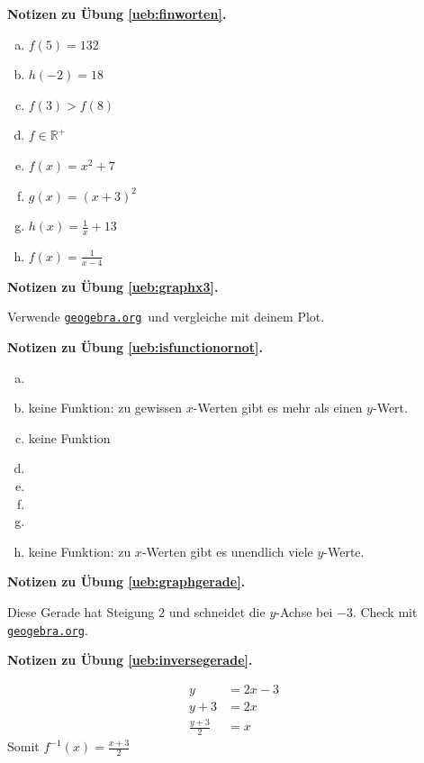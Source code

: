 \documentclass[%
11pt,%
twoside,%
titlepage,%
swissgerman,%
headsepline%
]{scrartcl}
\newcommand{\faReturnGray}{\textcolor{gray}{\faMailReply}} %
\newcommand{\geogebralink}{\href{https://www.geogebra.org/calculator}{\texttt{geogebra.org}}}
\theoremstyle{definition}
\theoremstyle{plain}
\newcommand{\concatueb}[1]{ueb:#1}%
\newcommand{\concatlsg}[1]{lsg:#1}%
\newenvironment{lsg}[1]{%
    \par\noindent\textbf{Notizen zu Übung \ref{\concatueb{#1}}.}%
    \label{\concatlsg{#1}} %
    \hfill\hyperref[\concatueb{#1}]{\faReturnGray}\par %
}{%
    \par%
}
\begin{document}
\begin{lsg}{finworten}
	\begin{enumerate}[a)]
		\item $f(5)=132$
		\item $h(-2)=18$
		\item $f(3)>f(8)$
		\item $f\in\mathbb{R}^{+}$
		\item $f(x)=x^{2}+7$
		\item $g(x)=(x+3)^{2}$
		\item $h(x)=\frac{1}{x}+13$
		\item $f(x)=\frac{1}{x-4}$
	\end{enumerate}
\end{lsg}
\begin{lsg}{graphx3}
	Verwende \geogebralink\   und vergleiche mit deinem Plot.
\end{lsg}
\begin{lsg}{isfunctionornot}
  \begin{enumerate}[a)]
    \item \checkmark
    \item keine Funktion: zu gewissen $x$-Werten gibt es mehr als einen $y$-Wert.
    \item keine Funktion
    \item \checkmark
    \item \checkmark
    \item \checkmark
    \item \checkmark
    \item keine Funktion: zu $x$-Werten gibt es unendlich viele $y$-Werte.
  \end{enumerate}
\end{lsg}

\begin{lsg}{graphgerade}
	Diese Gerade hat Steigung $2$ und schneidet die $y$-Achse bei $-3$. Check mit \geogebralink.
\end{lsg}

\begin{lsg}{inversegerade}
	\begin{align*}
	y &= 2x-3\tag{$+3$}\\
	y+3 &= 2x\tag{$\div2$}\\
	\frac{y+3}{2} &= x
	\end{align*}
Somit $f^{-1}(x)=\frac{x+3}{2}$
\end{lsg}
\end{document}
